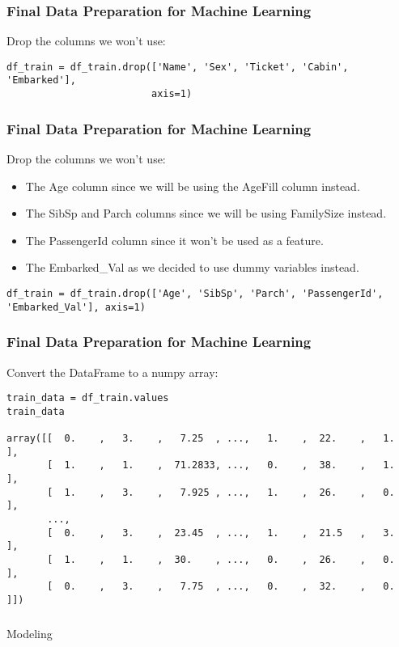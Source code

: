 \begin{frame}[fragile]\frametitle{Final Data Preparation for Machine Learning}
Drop the columns we won't use:
\begin{lstlisting}
df_train = df_train.drop(['Name', 'Sex', 'Ticket', 'Cabin', 'Embarked'], 
                         axis=1)
\end{lstlisting}

\end{frame}

\begin{frame}[fragile]\frametitle{Final Data Preparation for Machine Learning}
Drop the columns we won't use:
\begin{itemize}
\item  The Age column since we will be using the AgeFill column instead.
\item     The SibSp and Parch columns since we will be using FamilySize instead.
\item     The PassengerId column since it won't be used as a feature.
\item     The Embarked\_Val as we decided to use dummy variables instead.
\end{itemize}
\begin{lstlisting}
df_train = df_train.drop(['Age', 'SibSp', 'Parch', 'PassengerId', 'Embarked_Val'], axis=1)
\end{lstlisting}
\end{frame}

\begin{frame}[fragile]\frametitle{Final Data Preparation for Machine Learning}
Convert the DataFrame to a numpy array:
\begin{lstlisting}
train_data = df_train.values
train_data

array([[  0.    ,   3.    ,   7.25  , ...,   1.    ,  22.    ,   1.    ],
       [  1.    ,   1.    ,  71.2833, ...,   0.    ,  38.    ,   1.    ],
       [  1.    ,   3.    ,   7.925 , ...,   1.    ,  26.    ,   0.    ],
       ..., 
       [  0.    ,   3.    ,  23.45  , ...,   1.    ,  21.5   ,   3.    ],
       [  1.    ,   1.    ,  30.    , ...,   0.    ,  26.    ,   0.    ],
       [  0.    ,   3.    ,   7.75  , ...,   0.    ,  32.    ,   0.    ]])
\end{lstlisting}
\end{frame}

\begin{frame}[fragile]\frametitle{}
\begin{center}
{\Large Modeling}
\end{center}
\end{frame}

